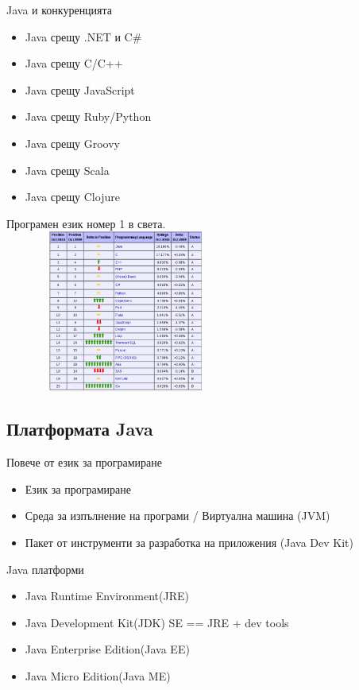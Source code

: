\documentclass{beamer}
\begin{document}
\begin{frame}{Java и конкуренцията}
  \transdissolve
  \begin{itemize}
    \item Java срещу .NET и C\#
    \item Java срещу C/C++
    \item Java срещу JavaScript
    \item Java срещу Ruby/Python
    \item Java срещу Groovy
    \item Java срещу Scala
    \item Java срещу Clojure
  \end{itemize}
\end{frame}

\begin{frame}{Програмен език номер 1 в света.}
  \transdissolve
  \includegraphics[width=300px,
  height=200px]{images/lang-current}
\end{frame}

\subsection{Платформата Java}

\begin{frame}{Повече от език за програмиране}
  \transdissolve
  \begin{itemize}
    \item Език за програмиране
    \item Среда за изпълнение на програми / Виртуална машина (JVM)
    \item Пакет от инструменти за разработка на приложения (Java Dev Kit)
  \end{itemize}

\end{frame}


\begin{frame}{Java платформи}
  \transdissolve
  \begin{itemize}
    \item Java Runtime Environment(JRE)
    \item Java Development Kit(JDK) SE == JRE + dev tools
    \item Java Enterprise Edition(Java EE)
    \item Java Micro Edition(Java ME)
  \end{itemize}
\end{frame}
\end{document}

